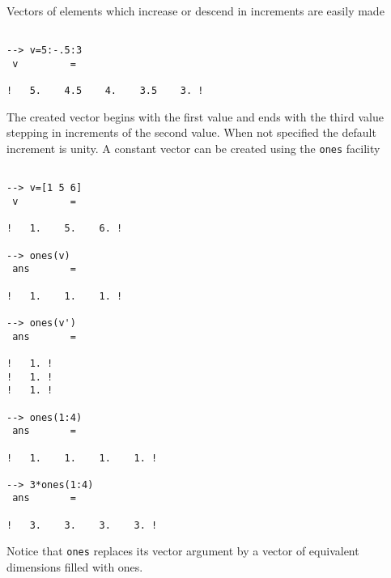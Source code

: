 	Vectors of elements which increase
or descend in increments are easily made
\begin{verbatim}
 
--> v=5:-.5:3
 v         =
 
!   5.    4.5    4.    3.5    3. !
\end{verbatim}
The created vector begins with the first value and ends
with the third value stepping in increments of the second value.
When not specified the default increment is unity.  A constant vector
can be created using the {\tt ones} 
facility 
\begin{verbatim}
 
--> v=[1 5 6]
 v         =
 
!   1.    5.    6. !
 
--> ones(v)
 ans       =
 
!   1.    1.    1. !
 
--> ones(v')
 ans       =
 
!   1. !
!   1. !
!   1. !
 
--> ones(1:4)
 ans       =
 
!   1.    1.    1.    1. !
 
--> 3*ones(1:4)
 ans       =
 
!   3.    3.    3.    3. !
\end{verbatim}
Notice that {\tt ones} replaces its vector argument by a vector 
of equivalent dimensions filled with ones.

